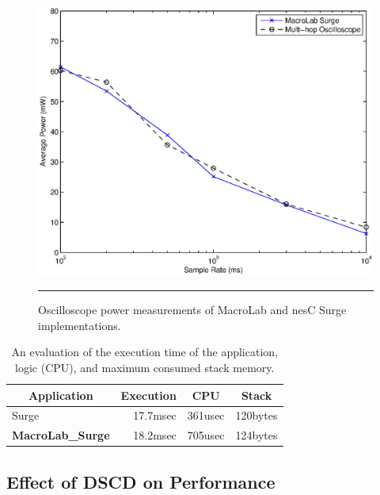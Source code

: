 \begin{figure}
  \centering
  \includegraphics[width=1\columnwidth]{fig/SurgePower}
  \smallskip
  \hrule
  \caption{Oscilloscope power measurements of MacroLab and nesC Surge
  implementations.} 
  \label{fig:powerConsumption}
\end{figure}



\begin{table}
  \centering
  \begin{minipage}{\columnwidth}
    \centering
    \begin{tabular}{|l|r|r|r|}
      \hline
      \multicolumn{1}{|c}{Application}& 
      \multicolumn{1}{|c|}{Execution} &
      \multicolumn{1}{|c|}{CPU} &
      \multicolumn{1}{c|}{Stack}\\
      \hline
      Surge&17.7msec&361usec&120bytes\\
      \bf{MacroLab\_Surge}&18.2msec&705usec&124bytes\\
      \hline
    \end{tabular}
  \end{minipage}
  \smallskip
  \caption[Execution time analysis]{An evaluation of the execution time of the application, logic (CPU), and maximum
    consumed stack memory.}
  \label{table:ExecutionTime}
\end{table}


\subsection{Effect of DSCD on Performance}\label{sect:PerformanceEval}

